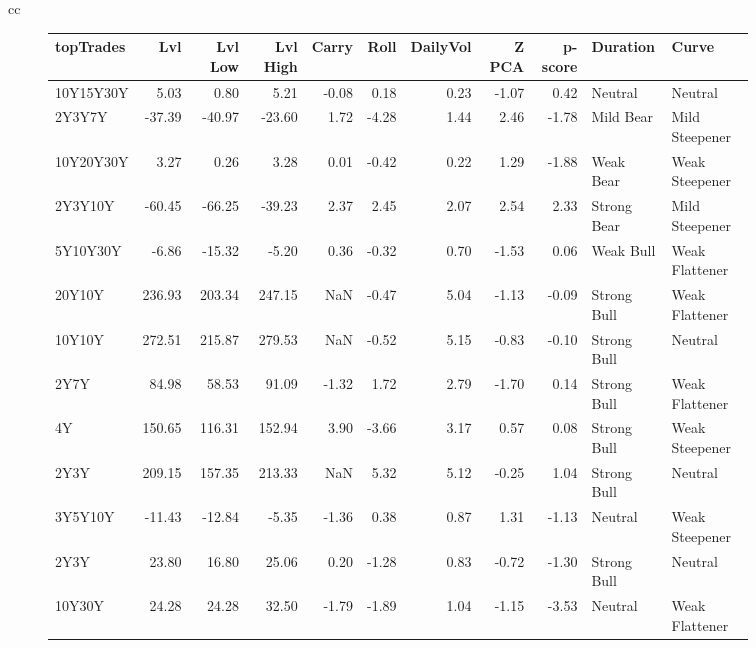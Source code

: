 \documentclass[a4paper,oneside]{report}
\begin{document}
\begin{figure}[htbp]
\begin{tabular}[c]{cc}
\begin{subfigure}[c]{0.5\textwidth}
\begin{adjustbox}{max width=\textwidth}
\begin{tabular}{lrrrrrrrrll}
\hline
 topTrades &     Lvl &  Lvl Low &  Lvl High &  Carry &  Roll &  DailyVol &  Z PCA &  p-score &     Duration &           Curve \\
\hline
 10Y15Y30Y &    5.03 &     0.80 &      5.21 &  -0.08 &  0.18 &      0.23 &  -1.07 &     0.42 &      Neutral &         Neutral \\
    2Y3Y7Y &  -37.39 &   -40.97 &    -23.60 &   1.72 & -4.28 &      1.44 &   2.46 &    -1.78 &    Mild Bear &  Mild Steepener \\
 10Y20Y30Y &    3.27 &     0.26 &      3.28 &   0.01 & -0.42 &      0.22 &   1.29 &    -1.88 &    Weak Bear &  Weak Steepener \\
   2Y3Y10Y &  -60.45 &   -66.25 &    -39.23 &   2.37 &  2.45 &      2.07 &   2.54 &     2.33 &  Strong Bear &  Mild Steepener \\
  5Y10Y30Y &   -6.86 &   -15.32 &     -5.20 &   0.36 & -0.32 &      0.70 &  -1.53 &     0.06 &    Weak Bull &  Weak Flattener \\
    20Y10Y &  236.93 &   203.34 &    247.15 &    NaN & -0.47 &      5.04 &  -1.13 &    -0.09 &  Strong Bull &  Weak Flattener \\
    10Y10Y &  272.51 &   215.87 &    279.53 &    NaN & -0.52 &      5.15 &  -0.83 &    -0.10 &  Strong Bull &         Neutral \\
      2Y7Y &   84.98 &    58.53 &     91.09 &  -1.32 &  1.72 &      2.79 &  -1.70 &     0.14 &  Strong Bull &  Weak Flattener \\
        4Y &  150.65 &   116.31 &    152.94 &   3.90 & -3.66 &      3.17 &   0.57 &     0.08 &  Strong Bull &  Weak Steepener \\
      2Y3Y &  209.15 &   157.35 &    213.33 &    NaN &  5.32 &      5.12 &  -0.25 &     1.04 &  Strong Bull &         Neutral \\
   3Y5Y10Y &  -11.43 &   -12.84 &     -5.35 &  -1.36 &  0.38 &      0.87 &   1.31 &    -1.13 &      Neutral &  Weak Steepener \\
      2Y3Y &   23.80 &    16.80 &     25.06 &   0.20 & -1.28 &      0.83 &  -0.72 &    -1.30 &  Strong Bull &         Neutral \\
    10Y30Y &   24.28 &    24.28 &     32.50 &  -1.79 & -1.89 &      1.04 &  -1.15 &    -3.53 &      Neutral &  Weak Flattener \\

\end{tabular}
\end{adjustbox}
\end{subfigure}
\end{tabular}
\end{figure}
\end{document}
